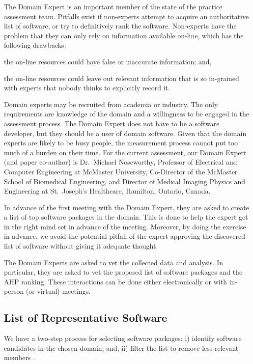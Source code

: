 \documentclass[11pt]{article}
\begin{document}
The Domain Expert is an important member of the state of the practice assessment
team. Pitfalls exist if non-experts attempt to acquire an authoritative list of
software, or try to definitively rank the software. Non-experts have the problem
that they can only rely on information available on-line, which has the
following drawbacks:
\begin{inparaenum}[i)]
  \item the on-line resources could have false or inaccurate information; and,
  \item the on-line resources could leave out relevant information that is so
in-grained with experts that nobody thinks to explicitly record it.
\end{inparaenum}

Domain experts may be recruited from academia or industry.  The only
requirements are knowledge of the domain and a willingness to be engaged in the
assessment process.  The Domain Expert does not have to be a software developer,
but they should be a user of domain software.  Given that the domain experts are
likely to be busy people, the measurement process cannot put too much of a burden
on their time.  For the current assessment, our Domain Expert (and paper
co-author) is Dr.\ Michael Noseworthy, Professor of Electrical and Computer
Engineering at McMaster University, Co-Director of the McMaster School of
Biomedical Engineering, and Director of Medical Imaging Physics and Engineering
at St.\ Joseph's Healthcare, Hamilton, Ontario, Canada.  

In advance of the first meeting with the Domain Expert, they are asked to
create a list of top software packages in the domain.  This is done to help
the expert get in the right mind set in advance of the meeting.  Moreover,
by doing the exercise in advance, we avoid the potential pitfall of the expert
approving the discovered list of software without giving it adequate thought.

The Domain Experts are asked to vet the collected data and analysis.  In
particular, they are asked to vet the proposed list of software packages and the
AHP ranking.  These interactions can be done either electronically or with
in-person (or virtual) meetings.

\subsection{List of Representative Software} \label{sec_software_selection}

We have a two-step process for selecting software packages: i) identify software
candidates in the chosen domain; and, ii) filter the list to remove less
relevant members \citep{SmithEtAl2021}.
\end{document}

